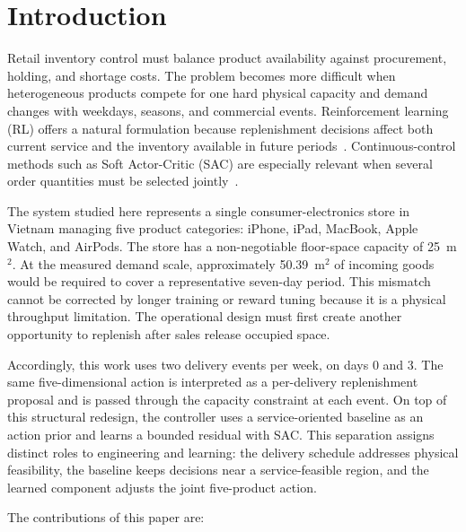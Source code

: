 \documentclass[pdflatex,sn-mathphys-num]{sn-jnl}
\begin{document}
\maketitle

\section{Introduction}\label{sec:introduction}

Retail inventory control must balance product availability against procurement, holding, and shortage costs. The problem becomes more difficult when heterogeneous products compete for one hard physical capacity and demand changes with weekdays, seasons, and commercial events. Reinforcement learning (RL) offers a natural formulation because replenishment decisions affect both current service and the inventory available in future periods~\cite{bib22}. Continuous-control methods such as Soft Actor-Critic (SAC) are especially relevant when several order quantities must be selected jointly~\cite{bib3,bib23}.

The system studied here represents a single consumer-electronics store in Vietnam managing five product categories: iPhone, iPad, MacBook, Apple Watch, and AirPods. The store has a non-negotiable floor-space capacity of 25~m$^2$. At the measured demand scale, approximately 50.39~m$^2$ of incoming goods would be required to cover a representative seven-day period. This mismatch cannot be corrected by longer training or reward tuning because it is a physical throughput limitation. The operational design must first create another opportunity to replenish after sales release occupied space.

Accordingly, this work uses two delivery events per week, on days 0 and 3. The same five-dimensional action is interpreted as a per-delivery replenishment proposal and is passed through the capacity constraint at each event. On top of this structural redesign, the controller uses a service-oriented baseline as an action prior and learns a bounded residual with SAC. This separation assigns distinct roles to engineering and learning: the delivery schedule addresses physical feasibility, the baseline keeps decisions near a service-feasible region, and the learned component adjusts the joint five-product action.

The contributions of this paper are:
\end{document}
